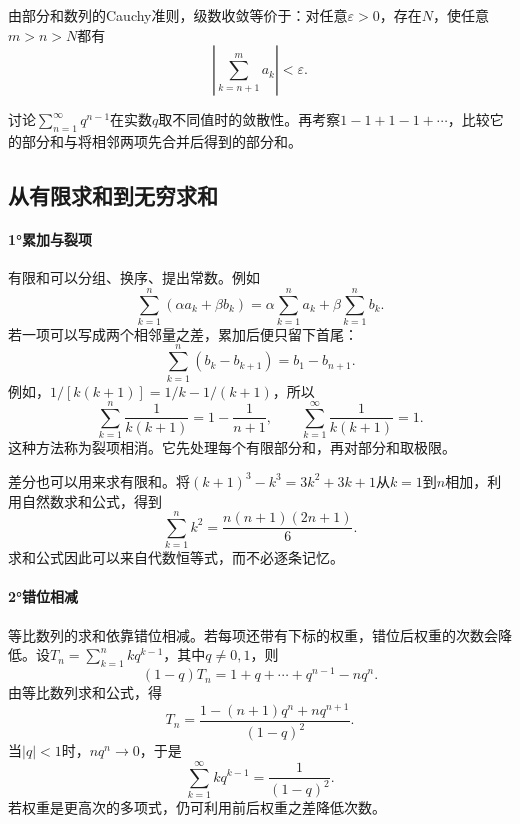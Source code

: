 由部分和数列的Cauchy准则，级数收敛等价于：对任意\(\varepsilon>0\)，存在\(N\)，使任意\(m>n>N\)都有
\begin{equation}\label{eq:analysis-series-cauchy}
 \left|\sum_{k=n+1}^{m}a_k\right|<\varepsilon.
\end{equation}

\begin{example}
讨论\(\sum_{n=1}^{\infty}q^{n-1}\)在实数\(q\)取不同值时的敛散性。再考察\(1-1+1-1+\cdots\)，比较它的部分和与将相邻两项先合并后得到的部分和。
\end{example}

\subsection{从有限求和到无穷求和}

\paragraph{1°累加与裂项} \mbox{}

有限和可以分组、换序、提出常数。例如
\begin{equation*}
 \sum_{k=1}^n(\alpha a_k+\beta b_k)
 =\alpha\sum_{k=1}^n a_k+\beta\sum_{k=1}^n b_k.
\end{equation*}
若一项可以写成两个相邻量之差，累加后便只留下首尾：
\begin{equation}\label{eq:analysis-telescoping-sum}
 \sum_{k=1}^n(b_k-b_{k+1})=b_1-b_{n+1}.
\end{equation}
例如，\(1/[k(k+1)]=1/k-1/(k+1)\)，所以
\begin{equation*}
 \sum_{k=1}^n\frac1{k(k+1)}=1-\frac1{n+1},
 \qquad \sum_{k=1}^{\infty}\frac1{k(k+1)}=1.
\end{equation*}
这种方法称为{\heiti{}裂项相消}。它先处理每个有限部分和，再对部分和取极限。

差分也可以用来求有限和。将\((k+1)^3-k^3=3k^2+3k+1\)从\(k=1\)到\(n\)相加，利用自然数求和公式，得到
\begin{equation*}
 \sum_{k=1}^n k^2=\frac{n(n+1)(2n+1)}6.
\end{equation*}
求和公式因此可以来自代数恒等式，而不必逐条记忆。

\paragraph{2°错位相减} \mbox{}

等比数列的求和依靠错位相减。若每项还带有下标的权重，错位后权重的次数会降低。设\(T_n=\sum_{k=1}^n kq^{k-1}\)，其中\(q\ne0,1\)，则
\begin{equation*}
 (1-q)T_n=1+q+\cdots+q^{n-1}-nq^n.
\end{equation*}
由等比数列求和公式，得
\begin{equation}\label{eq:analysis-weighted-geometric-sum}
 T_n=\frac{1-(n+1)q^n+nq^{n+1}}{(1-q)^2}.
\end{equation}
当\(|q|<1\)时，\(nq^n\to0\)，于是
\begin{equation*}
 \sum_{k=1}^{\infty}kq^{k-1}=\frac1{(1-q)^2}.
\end{equation*}
若权重是更高次的多项式，仍可利用前后权重之差降低次数。

